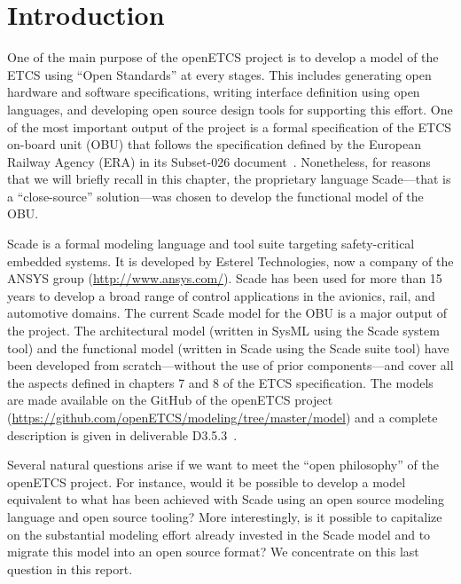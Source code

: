 \documentclass{template/openetcs_report}
\begin{document}

\mainmatter


\chapter{Introduction}
\label{cha:introduction}

One of the main purpose of the openETCS project is to develop a model
of the ETCS using ``Open Standards'' at every stages. This includes
generating open hardware and software specifications, writing
interface definition using open languages, and developing open source
design tools for supporting this effort. One of the most important
output of the project is a formal specification of the ETCS on-board
unit (OBU) that follows the specification defined by the European
Railway Agency (ERA) in its Subset-026
document~\cite{subset-026}. Nonetheless, for reasons that we will
briefly recall in this chapter, the proprietary language Scade---that
is a ``close-source'' solution---was chosen to develop the functional
model of the OBU.

Scade is a formal modeling language and tool suite targeting
safety-critical embedded systems. It is developed by Esterel
Technologies, now a company of the ANSYS group
(\url{http://www.ansys.com/}). Scade has been used for more than 15
years to develop a broad range of control applications in the
avionics, rail, and automotive domains. The current Scade model for
the OBU is a major output of the project. The architectural model
(written in SysML using the Scade system tool) and the functional
model (written in Scade using the Scade suite tool) have been
developed from scratch---without the use of prior components---and
cover all the aspects defined in chapters 7 and 8 of the ETCS
specification. The models are made available on the GitHub of the
openETCS project
(\url{https://github.com/openETCS/modeling/tree/master/model}) and a
complete description is given in deliverable D3.5.3~\cite{d353}.

Several natural questions arise if we want to meet the ``open
philosophy'' of the openETCS project. For instance, would it be
possible to develop a model equivalent to what has been achieved with
Scade using an open source modeling language and open source tooling?
More interestingly, is it possible to capitalize on the substantial
modeling effort already invested in the Scade model and to migrate
this model into an open source format?  We concentrate on this last
question in this report.
\end{document}
